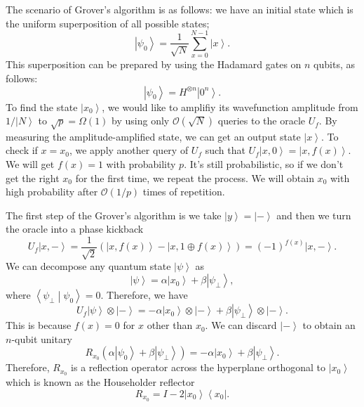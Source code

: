 \documentclass[11pt]{article}
\newcommand{\braket}[2]{\left \langle #1 \middle| #2 \right \rangle}
\newcommand{\bra}[1]{\left\langle #1\right|}
\newcommand{\ket}[1]{\left|#1\right\rangle}
\begin{document}
The scenario of Grover's algorithm is as follows: we have an initial state which is the uniform superposition of all possible states; 
\begin{equation}
    \ket{\psi_0} = \frac{1}{\sqrt{N}}\sum_{x=0}^{N-1}\ket{x}.
\end{equation}
This superposition can be prepared by using the Hadamard gates on $n$ qubits, as follows: 
\begin{equation}
    \ket{\psi_0} = H^{\otimes n}\ket{0^n}.
\end{equation}
To find the state $\ket{x_0}$, we would like to amplifiy its wavefunction amplitude from $1/\ket{N}$ to $\sqrt{p} = \Omega(1)$ by using only $\mathcal{O}(\sqrt{N})$ queries to the oracle $U_f$. By measuring 
the amplitude-amplified state, we can get an output state $\ket{x}$. To check if $x = x_0$, we apply another query of $U_f$ such that $U_f\ket{x,0} = \ket{x, f(x)}$. We will get $f(x) = 1$ with probability $p$. It's still probabilistic, so if we don't get the right $x_0$ for the first time, 
we repeat the process. We will obtain $x_0$ with high probability after $\mathcal{O}(1/p)$ times of repetition.

The first step of the Grover's algorithm is we take $\ket{y} = \ket{-}$ and then we turn the oracle into a phase kickback
\begin{equation}
    U_f\ket{x,-} = \frac{1}{\sqrt{2}}(\ket{x, f(x)} - \ket{x, 1\oplus f(x)}) = (-1)^{f(x)}\ket{x,-}.
\end{equation}
We can decompose any quantum state $\ket{\psi}$ as 
\begin{equation}
    \ket{\psi} = \alpha\ket{x_0} + \beta\ket{\psi_{\perp}},
\end{equation}
where $\braket{\psi_{\perp}}{\psi_0} = 0$. Therefore, we have 
\begin{equation}
    U_f\ket{\psi}\otimes\ket{-} = -\alpha\ket{x_0}\otimes\ket{-} + \beta\ket{\psi_{\perp}}\otimes\ket{-}.
\end{equation}
This is because $f(x) = 0$ for $x$ other than $x_0$. We can discard $\ket{-}$ to obtain an $n$-qubit unitary 
\begin{equation}
    R_{x_0}(\alpha\ket{\psi_0} + \beta\ket{\psi_{\perp}}) = -\alpha\ket{x_0} + \beta\ket{\psi_{\perp}}.
\end{equation}
Therefore, $R_{x_0}$ is a reflection operator across the hyperplane orthogonal to $\ket{x_0}$ which is known as the Householder reflector 
\begin{equation}
    R_{x_0} = I - 2\ket{x_0}\bra{x_0}.
\end{equation}
\end{document}
